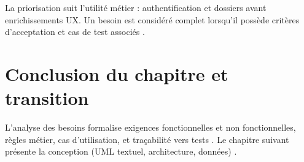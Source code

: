La priorisation suit l'utilité métier : authentification et dossiers avant enrichissements UX. Un besoin est considéré complet lorsqu'il possède critères d'acceptation et cas de test associés \cite{ieee1012,sommerville2016}.

\section{Conclusion du chapitre et transition}

L'analyse des besoins formalise exigences fonctionnelles et non fonctionnelles, règles métier, cas d'utilisation, et traçabilité vers tests \cite{pressman2014}. Le chapitre suivant présente la conception (UML textuel, architecture, données) \cite{booch2005,bass2021}.

